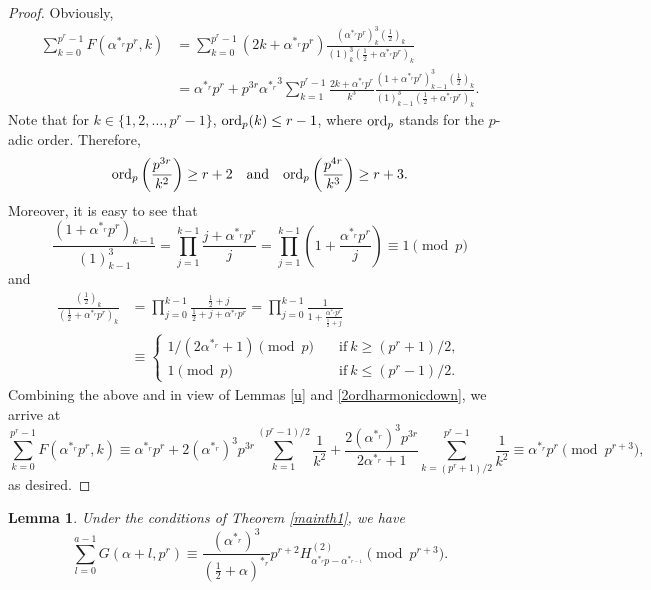 \documentclass[12pt,reqno]{amsart}
\def\l{\left}
\def\r{\right}
\def\t{\text}
\def\f{\frac}
\def\ord{{\rm ord}}
\def\eq{\equiv}
\theoremstyle{plain}
\newtheorem{lemma}{Lemma}[section]
\theoremstyle{definition}
\theoremstyle{remark}
\numberwithin{equation}{section}
\begin{document}
\begin{proof}
Obviously,
\begin{align*}
\sum_{k=0}^{p^r-1}F(\alpha^{\ast_r}p^r,k)&=\sum_{k=0}^{p^r-1}(2k+\alpha^{\ast_r}p^r)\f{(\alpha^{\ast_r}p^r)_k^3(\f12)_k}{(1)_k^3(\f12+\alpha^{\ast_r}p^r)_k}\\
&=\alpha^{\ast_r}p^r+p^{3r}{\alpha^{\ast_r}}^3\sum_{k=1}^{p^r-1}\f{2k+\alpha^{\ast_r}p^r}{k^3}\f{(1+\alpha^{\ast_r}p^r)_{k-1}^3(\f12)_k}{(1)_{k-1}^3(\f12+\alpha^{\ast_r}p^r)_k}.
\end{align*}
Note that for $k\in\{1,2,\ldots,p^r-1\}$, $\ord_p(k)\leq r-1$, where $\ord_p$ stands for the $p$-adic order. Therefore,
$$
\ord_p\l(\f{p^{3r}}{k^2}\r)\geq r+2\quad \t{and}\quad \ord_p\l(\f{p^{4r}}{k^3}\r)\geq r+3.
$$
Moreover, it is easy to see that
$$
\f{(1+\alpha^{\ast_r}p^r)_{k-1}}{(1)_{k-1}^3}=\prod_{j=1}^{k-1}\f{j+\alpha^{\ast_r}p^r}{j}=\prod_{j=1}^{k-1}\l(1+\f{\alpha^{\ast_r}p^r}{j}\r)\eq1\pmod{p}
$$
and
\begin{align*}
\f{(\f12)_k}{(\f12+\alpha^{\ast_r}p^r)_k}&=\prod_{j=0}^{k-1}\f{\f12+j}{\f12+j+\alpha^{\ast_r}p^r}=\prod_{j=0}^{k-1}\f{1}{1+\f{\alpha^{\ast_r}p^r}{\f12+j}}\\
&\eq\begin{cases}1/(2\alpha^{\ast_r}+1)\pmod{p}\quad&\t{if}\ k\geq (p^r+1)/2,\\ 1\pmod{p}\quad&\t{if}\ k\leq (p^r-1)/2.\end{cases}
\end{align*}
Combining the above and in view of Lemmas \ref{u} and  \ref{2ordharmonicdown}, we arrive at
$$
\sum_{k=0}^{p^r-1}F(\alpha^{\ast_r}p^r,k)\eq \alpha^{\ast_r}p^r+2(\alpha^{\ast_r})^3p^{3r}\sum_{k=1}^{(p^r-1)/2}\f{1}{k^2}+\f{2(\alpha^{\ast_r})^3p^{3r}}{2\alpha^{\ast_r}+1}\sum_{k=(p^r+1)/2}^{p^r-1}\f{1}{k^2}\eq  \alpha^{\ast_r}p^r \pmod{p^{r+3}},
$$
as desired.
\end{proof}

\begin{lemma}\label{evalG}
Under the conditions of Theorem \ref{mainth1}, we have
\begin{equation}\label{evalGeq}
\sum_{l=0}^{a-1}G(\alpha+l,p^r)\eq \f{(\alpha^{\ast_r})^3}{(\f12+\alpha)^{\ast_r}}p^{r+2}H_{\alpha^{\ast_r}p-\alpha^{\ast_{r-1}}}^{(2)}\pmod{p^{r+3}}.
\end{equation}
\end{lemma}
\end{document}

